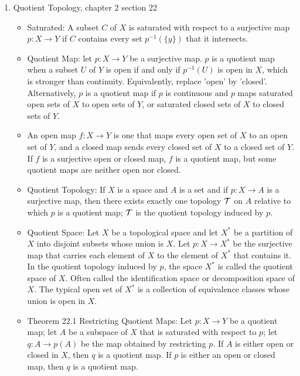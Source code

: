 \documentclass[12pt,letterpaper]{article}
\begin{document}
\begin{enumerate}
\begin{itemize}
  \end{itemize}
  \item \label{dfn:quotientMapTopology} Quotient Topology, chapter 2 section 22
  \begin{itemize}
    \item \label{dfn:saturated} Saturated: A subset $C$ of $X$ is saturated with respect to a surjective map $p: X\rightarrow Y$ if $C$ contains every set $p^{-1}(\{y\})$ that it intersects. 
    \item \label{dfn:quotientMap} Quotient Map: let $p: X\rightarrow Y$ be a surjective map. $p$ is a quotient map when a subset $U$ of $Y$ is open if and only if $p^{-1}(U)$ is open in $X$, which is stronger than continuity. Equivalently, replace 'open' by 'closed'. Alternatively, $p$ is a quotient map if $p$ is continuous and $p$ maps saturated open sets of $X$ to open sets of $Y$, or saturated closed sets of $X$ to closed sets of $Y$.
    \item \label{dfn:OpenClosedMap} An open map $f:X\rightarrow Y$ is one that maps every open set of $X$ to an open set of $Y$, and a closed map sends every closed set of $X$ to a closed set of $Y$. If $f$ is a surjective open or closed map, $f$ is a quotient map, but some quotient maps are neither open nor closed.
    \item \label{dfn:quotientTopology} Quotient Topology: If $X$ is a space and $A$ is a set and if $p: X\rightarrow A$ is a surjective map, then there exists exactly one topology $\mathcal{T}$ on $A$ relative to which $p$ is a quotient map; $\mathcal{T}$ is the quotient topology induced by $p$.
    \item \label{dfn:quotientSpace} Quotient Space: Let $X$ be a topological space and let $X^*$ be a partition of $X$ into disjoint subsets whose union is $X$. Let $p: X\rightarrow X^*$ be the surjective map that carries each element of $X$ to the element of $X^*$ that contains it. In the quotient topology induced by $p$, the space $X^*$ is called the quotient space of $X$. Often called the identification space or decomposition space of $X$. The typical open set of $X^*$ is a collection of equivalence classes whose union is open in $X$.
    \item \label{thm:restrictionQuotientMap} Theorem 22.1 Restricting Quotient Maps: Let $p: X\rightarrow Y$ be a quotient map; let $A$ be a subspace of $X$ that is saturated with respect to $p$; let $q: A\rightarrow p(A)$ be the map obtained by restricting $p$. If $A$ is either open or closed in $X$, then $q$ is a quotient map. If $p$ is either an open or closed map, then $q$ is a quotient map.

\end{itemize}
\end{enumerate}
\end{document}
